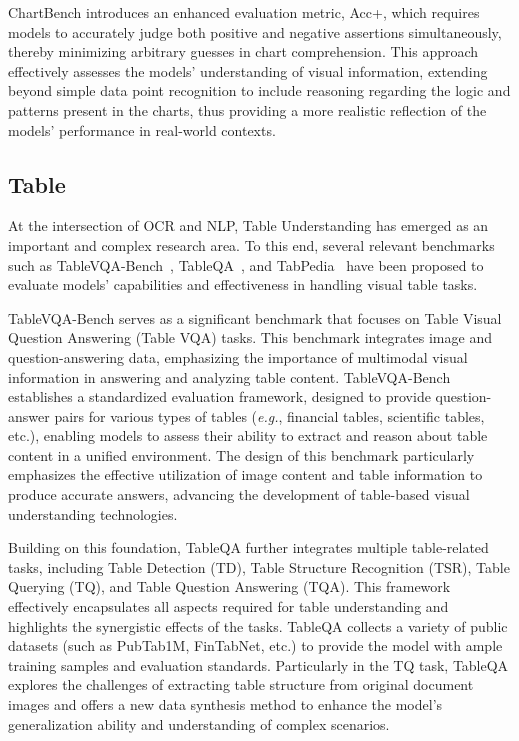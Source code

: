 ChartBench introduces an enhanced evaluation metric, Acc+, which requires models to accurately judge both positive and negative assertions simultaneously, thereby minimizing arbitrary guesses in chart comprehension. This approach effectively assesses the models' understanding of visual information, extending beyond simple data point recognition to include reasoning regarding the logic and patterns present in the charts, thus providing a more realistic reflection of the models' performance in real-world contexts.
\subsection{Table}
At the intersection of OCR and NLP, Table Understanding has emerged as an important and complex research area. To this end, several relevant benchmarks such as TableVQA-Bench~\cite{Kim2024ARXIV_TableVQA_Bench_A}, TableQA~\cite{sun2020tableqa}, and TabPedia~\cite{Zhao2024NEURIPS_TabPedia_Towards_Comprehensive} have been proposed to evaluate models’ capabilities and effectiveness in handling visual table tasks.

TableVQA-Bench serves as a significant benchmark that focuses on Table Visual Question Answering (Table VQA) tasks. This benchmark integrates image and question-answering data, emphasizing the importance of multimodal visual information in answering and analyzing table content. TableVQA-Bench establishes a standardized evaluation framework, designed to provide question-answer pairs for various types of tables (\emph{e.g.}, financial tables, scientific tables, etc.), enabling models to assess their ability to extract and reason about table content in a unified environment. The design of this benchmark particularly emphasizes the effective utilization of image content and table information to produce accurate answers, advancing the development of table-based visual understanding technologies.

Building on this foundation, TableQA further integrates multiple table-related tasks, including Table Detection (TD), Table Structure Recognition (TSR), Table Querying (TQ), and Table Question Answering (TQA). This framework effectively encapsulates all aspects required for table understanding and highlights the synergistic effects of the tasks. TableQA collects a variety of public datasets (such as PubTab1M, FinTabNet, etc.) to provide the model with ample training samples and evaluation standards. Particularly in the TQ task, TableQA explores the challenges of extracting table structure from original document images and offers a new data synthesis method to enhance the model's generalization ability and understanding of complex scenarios.

